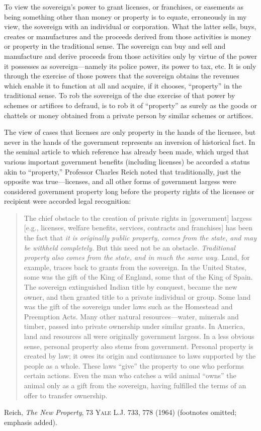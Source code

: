 To view the sovereign's power to grant licenses, or franchises, or easements as
being something other than money or property is to equate, erroneously in my
view, the sovereign with an individual or corporation. What the latter sells,
buys, creates or manufactures and the proceeds derived from those activities is
money or property in the traditional sense. The sovereign can buy and sell and
manufacture and derive proceeds from those activities only by virtue of the
power it possesses as sovereign---namely its police power, its power to tax,
etc. It is only through the exercise of those powers that the sovereign obtains
the revenues which enable it to function at all and acquire, if it chooses,
``property'' in the traditional sense. To rob the sovereign of the due exercise
of that power by schemes or artifices to defraud, is to rob it of ``property''
as surely as the goods or chattels or money obtained from a private person by
similar schemes or artifices.

The view of cases that licenses are only property in the hands of the licensee,
but never in the hands of the government represents an inversion of historical
fact. In the seminal article to which reference has already been made, which
urged that various important government benefits (including licenses) be
accorded a status akin to ``property,'' Professor Charles Reich noted that
traditionally, just the opposite was true---licenses, and all other forms of
government largess were considered government property long before the property
rights of the licensee or recipient were accorded legal recognition:
\begin{quote}
The chief obstacle to the creation of private rights in [government] largess
[e.g., licenses, welfare benefits, services, contracts and franchises] has been
the fact that \textit{it is originally public property, comes from the state,
and may be withheld completely.} But this need not be an obstacle.
\textit{Traditional property also comes from the state, and in much the same
way.} Land, for example, traces back to grants from the sovereign. In the
United States, some was the gift of the King of England, some that of the King
of Spain. The sovereign extinguished Indian title by conquest, became the new
owner, and then granted title to a private individual or group. Some land was
the gift of the sovereign under laws such as the Homestead and Preemption Acts.
Many other natural resources---water, minerals and timber, passed into private
ownership under similar grants. In America, land and resources all were
originally government largess. In a less obvious sense, personal property also
stems from government. Personal property is created by law; it owes its origin
and continuance to laws supported by the people as a whole. These laws ``give''
the property to one who performs certain actions. Even the man who catches a
wild animal ``owns'' the animal only as a gift from the sovereign, having
fulfilled the terms of an offer to transfer ownership.
\end{quote}
Reich, \textit{The New Property}, 73 \textsc{Yale L.J.} 733,
778 (1964) (footnotes omitted; emphasis added).

